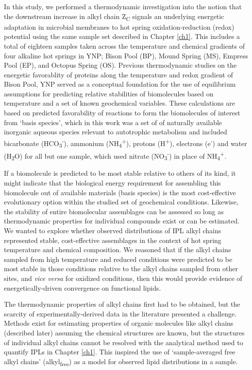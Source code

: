 In this study, we performed a thermodynamic investigation into the notion that the downstream increase in alkyl chain Z\textsubscript{C} signals an underlying energetic adaptation in microbial membranes to hot spring oxidation-reduction (redox) potential using the same sample set described in Chapter \ref{ch1}. This includes a total of eighteen samples taken across the temperature and chemical gradients of four alkaline hot springs in YNP; Bison Pool (BP), Mound Spring (MS), Empress Pool (EP), and Octopus Spring (OS). Previous thermodynamic studies on the energetic favorablity of proteins along the temperature and redox gradient of Bison Pool, YNP \citep{dick2011calculation, dick2013metastable} served as a conceptual foundation for the use of equilibrium assumptions for predicting relative stabilities of biomolecules based on temperature and a set of known geochemical variables. These calculations are based on predicted favorability of reactions to form the biomolecules of interest from `basis species', which in this work was a set of of naturally available inorganic aqueous species relevant to autotrophic metabolism and included bicarbonate (HCO\textsubscript{3}\textsuperscript{-}), ammonium (NH\textsubscript{4}\textsuperscript{+}), protons (H\textsuperscript{+}), electrons (e\textsuperscript{-}) and water (H\textsubscript{2}O) for all but one sample, which used nitrate (NO\textsubscript{3}\textsuperscript{-}) in place of NH\textsubscript{4}\textsuperscript{+}.

If a biomolecule is predicted to be most stable relative to others of its kind, it might indicate that the biological energy requirement for assembling this biomolecule out of available materials (basis species) is the most cost-effective evolutionary option within the studied set of geochemical conditions. Likewise, the stability of entire biomolecular assemblages can be assessed so long as thermodynamic properties for individual compounds exist or can be estimated. We wanted to explore whether observed distributions of IPL alkyl chains represented stable, cost-effective assemblages in the context of hot spring temperature and chemical composition. We reasoned that if the alkyl chains sampled from high temperature and reduced conditions were predicted to be most stable in those conditions relative to the alkyl chains sampled from other sites, and \textit{vice versa} for oxidized conditions, then this would provide evidence of energetically-driven convergence on functional lipids.

The thermodynamic properties of alkyl chains first had to be obtained, but the scarcity of experimentally-derived data in the literature presented a challenge. Methods exist for estimating properties of organic molecules like alkyl chains (described later) assuming the chemical structures are known, but the structures of individual alkyl chains cannot be resolved with the analytical method used to quantify IPLs in Chapter \ref{ch1}. This inspired the use of `sample-averaged free alkyl chains' (alkyl\textsubscript{free}) as a model for observed lipid distributions in a sample.

